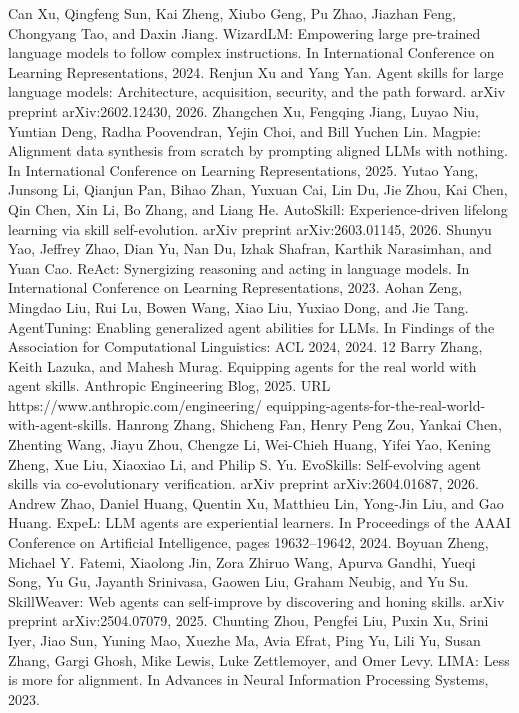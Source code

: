 Can Xu, Qingfeng Sun, Kai Zheng, Xiubo Geng, Pu Zhao, Jiazhan Feng, Chongyang Tao, and Daxin
Jiang. WizardLM: Empowering large pre-trained language models to follow complex instructions.
In International Conference on Learning Representations, 2024.
Renjun Xu and Yang Yan. Agent skills for large language models: Architecture, acquisition, security,
and the path forward. arXiv preprint arXiv:2602.12430, 2026.
Zhangchen Xu, Fengqing Jiang, Luyao Niu, Yuntian Deng, Radha Poovendran, Yejin Choi, and
Bill Yuchen Lin. Magpie: Alignment data synthesis from scratch by prompting aligned LLMs with
nothing. In International Conference on Learning Representations, 2025.
Yutao Yang, Junsong Li, Qianjun Pan, Bihao Zhan, Yuxuan Cai, Lin Du, Jie Zhou, Kai Chen, Qin
Chen, Xin Li, Bo Zhang, and Liang He. AutoSkill: Experience-driven lifelong learning via skill
self-evolution. arXiv preprint arXiv:2603.01145, 2026.
Shunyu Yao, Jeffrey Zhao, Dian Yu, Nan Du, Izhak Shafran, Karthik Narasimhan, and Yuan Cao.
ReAct: Synergizing reasoning and acting in language models. In International Conference on
Learning Representations, 2023.
Aohan Zeng, Mingdao Liu, Rui Lu, Bowen Wang, Xiao Liu, Yuxiao Dong, and Jie Tang. AgentTuning:
Enabling generalized agent abilities for LLMs. In Findings of the Association for Computational
Linguistics: ACL 2024, 2024.
12
Barry Zhang, Keith Lazuka, and Mahesh Murag. Equipping agents for the real world with agent
skills. Anthropic Engineering Blog, 2025. URL https://www.anthropic.com/engineering/
equipping-agents-for-the-real-world-with-agent-skills.
Hanrong Zhang, Shicheng Fan, Henry Peng Zou, Yankai Chen, Zhenting Wang, Jiayu Zhou, Chengze
Li, Wei-Chieh Huang, Yifei Yao, Kening Zheng, Xue Liu, Xiaoxiao Li, and Philip S. Yu. EvoSkills:
Self-evolving agent skills via co-evolutionary verification. arXiv preprint arXiv:2604.01687, 2026.
Andrew Zhao, Daniel Huang, Quentin Xu, Matthieu Lin, Yong-Jin Liu, and Gao Huang. ExpeL: LLM
agents are experiential learners. In Proceedings of the AAAI Conference on Artificial Intelligence,
pages 19632–19642, 2024.
Boyuan Zheng, Michael Y. Fatemi, Xiaolong Jin, Zora Zhiruo Wang, Apurva Gandhi, Yueqi Song,
Yu Gu, Jayanth Srinivasa, Gaowen Liu, Graham Neubig, and Yu Su. SkillWeaver: Web agents can
self-improve by discovering and honing skills. arXiv preprint arXiv:2504.07079, 2025.
Chunting Zhou, Pengfei Liu, Puxin Xu, Srini Iyer, Jiao Sun, Yuning Mao, Xuezhe Ma, Avia Efrat,
Ping Yu, Lili Yu, Susan Zhang, Gargi Ghosh, Mike Lewis, Luke Zettlemoyer, and Omer Levy.
LIMA: Less is more for alignment. In Advances in Neural Information Processing Systems, 2023.
